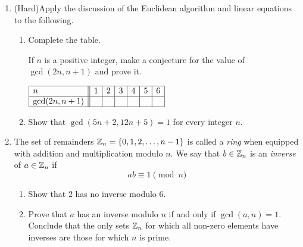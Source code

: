 \begin{exercises}{}{}
\begin{enumerate}
	    
	  \item (Hard)\lstsp Apply the discussion of the Euclidean algorithm and linear equations to the following.
	  
	  \begin{enumerate}
	    \item Complete the table.\par
	    \begin{minipage}[t]{0.55\linewidth}\vspace{-8pt}
	  	If $n$ is a positive integer, make a conjecture for the value of $\gcd(2n,n+1)$ and prove it.
	    \end{minipage}
	    \hfill
	    \begin{minipage}[t]{0.43\linewidth}\vspace{-20pt}
	    \flushright
	    $\begin{array}{|l||c|c|c|c|c|c|}
	  			\hline
	  			n&1&2&3&4&5&6\\\hline
	  			\gcd(2n,n+1)&&&&&&\\\hline
	  		\end{array}$
	    \end{minipage}
	
	  	\item Show that $\gcd(5n+2,12n+5)=1$ for every integer $n$.
	  \end{enumerate}
	
	
	  \item\label{exs:ringintro} The set of remainders $\mathbb{Z}_n=\{0,1,2,\ldots,n-1\}$ is called a \emph{ring} when equipped with addition and multiplication modulo $n$. We say that $b\in\mathbb{Z}_n$ is an \emph{inverse} of $a\in\mathbb{Z}_n$ if
		\[
			ab\equiv 1\pmod n
		\]
		\begin{enumerate}
		  \item Show that 2 has no inverse modulo 6.
		  \item Prove that $a$ has an inverse modulo $n$ if and only if $\gcd(a,n)=1$. Conclude that the only sets $\mathbb{Z}_n$ for which all non-zero elements have inverses are those for which $n$ is prime.	  
		\end{enumerate}
		
		
	  
	
	  
	\end{enumerate}

\end{exercises}

